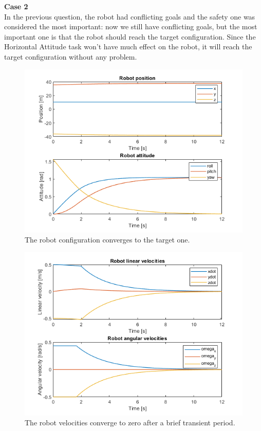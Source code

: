 \documentclass{article}
\begin{document}
{\large \textbf{Case 2}} \\
In the previous question, the robot had conflicting goals and the safety one was considered the most important: now we still have conflicting goals, but the most important one is that the robot should reach the target configuration. Since the Horizontal Attitude task won't have much effect on the robot, it will reach the target configuration without any problem.
\begin{figure}[H]
	\centering
	\includegraphics[width=0.7\linewidth]{images/Ex1/HorAtt_LowPrio_SameStartpos_DifferentEndpos_PosAndAtt}
	\caption{The robot configuration converges to the target one.}
	\label{fig:q3case2a}
\end{figure}
\begin{figure}[H]
	\centering
	\includegraphics[width=0.7\linewidth]{images/Ex1/HorAtt_LowPrio_SameStartpos_DifferentEndpos_LinAngVelocities}
	\caption{The robot velocities converge to zero after a brief transient period.}
	\label{fig:q3case2b}
\end{figure}
\end{document}
